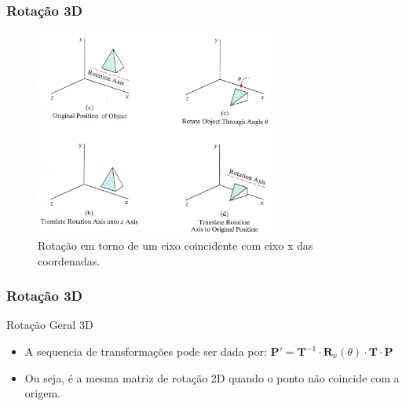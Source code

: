 \documentclass{beamer}
\begin{document}
\begin{frame}
\frametitle{Rotação 3D}


	\begin{figure}[!h]
			\begin{center}
			\includegraphics[width=0.7\textwidth]{Figures/RotGer}
			\caption{Rotação em torno de um eixo coincidente com eixo x das coordenadas.}
			\end{center}
	\end{figure}
	
\end{frame}

\begin{frame}
\frametitle{Rotação 3D}


	\begin{block}{Rotação Geral 3D}
		\begin{itemize}
			\item A sequencia de transformações pode ser dada por:
				$\textbf{P}' = \textbf{T}^{-1} \cdot \textbf{R}_{x}(\theta) \cdot \textbf{T} \cdot \textbf{P}$
				
			\item Ou seja, é a mesma matriz de rotação 2D quando o ponto não coincide com a origem.
		\end{itemize}
	\end{block}
	
\end{frame}
\end{document}
